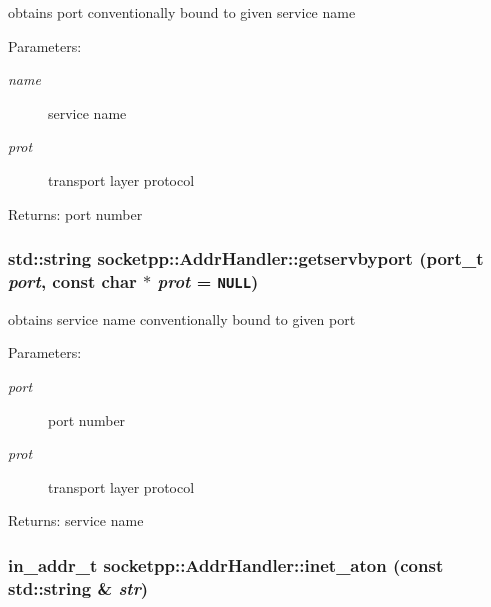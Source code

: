 obtains port conventionally bound to given service name 

\begin{Desc}
\item[Parameters:]
\begin{description}
\item[{\em name}]service name \item[{\em prot}]transport layer protocol \end{description}
\end{Desc}
\begin{Desc}
\item[Returns:]port number \end{Desc}
\hypertarget{classsocketpp_1_1AddrHandler_f221cac56bf3808494806d335a56bb87}{
\subsubsection[{getservbyport}]{\setlength{\rightskip}{0pt plus 5cm}std::string socketpp::AddrHandler::getservbyport ({\bf port\_\-t} {\em port}, \/  const char $\ast$ {\em prot} = {\tt NULL})}}
\label{classsocketpp_1_1AddrHandler_f221cac56bf3808494806d335a56bb87}


obtains service name conventionally bound to given port 

\begin{Desc}
\item[Parameters:]
\begin{description}
\item[{\em port}]port number \item[{\em prot}]transport layer protocol \end{description}
\end{Desc}
\begin{Desc}
\item[Returns:]service name \end{Desc}
\hypertarget{classsocketpp_1_1AddrHandler_e2eda37cd4c20059c557e4e65c829cf8}{
\subsubsection[{inet\_\-aton}]{\setlength{\rightskip}{0pt plus 5cm}in\_\-addr\_\-t socketpp::AddrHandler::inet\_\-aton (const std::string \& {\em str})}}
\label{classsocketpp_1_1AddrHandler_e2eda37cd4c20059c557e4e65c829cf8}


